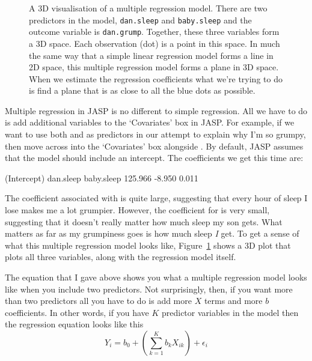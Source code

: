 \begin{figure}[!htb]
\begin{center}
\caption{A 3D visualisation of a multiple regression model. There are two predictors in the model, \texttt{dan.sleep} and \texttt{baby.sleep} and the outcome variable is \texttt{dan.grump}. Together, these three variables form a 3D space. Each observation (dot) is a point in this space. In much the same way that a simple linear regression model forms a line in 2D space, this multiple regression model forms a plane in 3D space. When we estimate the regression coefficients what we're trying to do is find a plane that is as close to all the blue dots as possible.}
\label{fig:multipleregression}
\end{center}
\end{figure}


Multiple regression in JASP is no different to simple regression. All we have to do is add additional variables to the `Covariates' box in JASP. For example, if we want to use both  and  as predictors in our attempt to explain why I'm so grumpy, then move  across into the `Covariates' box alongside . By default, JASP assumes that the model should include an intercept. The coefficients we get this time are:

\begin{rblock1}
(Intercept)    dan.sleep   baby.sleep  
  125.966        -8.950       0.011  
\end{rblock1}

The coefficient associated with  is quite large, suggesting that every hour of sleep I lose makes me a lot grumpier. However, the coefficient for  is very small, suggesting that it doesn't really matter how much sleep my son gets. What matters as far as my grumpiness goes is how much sleep {\it I} get. To get a sense of what this multiple regression model looks like, Figure~\ref{fig:multipleregression} shows a 3D plot that plots all three variables, along with the regression model itself. 

\vspace{0.6cm}
\begin{mdframed}[style=MyFrame,nobreak=true]

The equation that I gave above shows you what a multiple regression model looks like when you include two predictors. Not surprisingly, then, if you want more than two predictors all you have to do is add more $X$ terms and more $b$ coefficients. In other words, if you have $K$ predictor variables in the model then the regression equation looks like this
$$
Y_i = b_0 + \left( \sum_{k=1}^K b_{k} X_{ik} \right) + \epsilon_i
$$
\end{mdframed}


